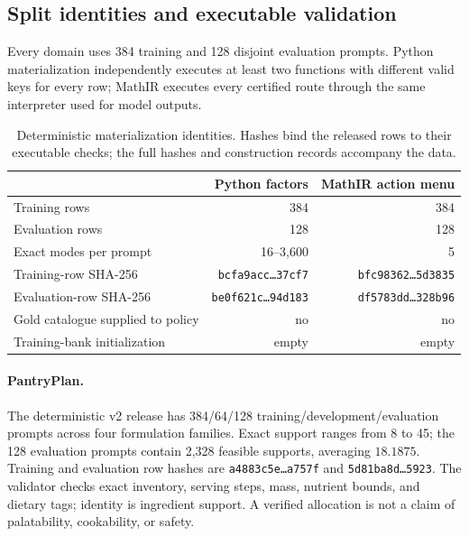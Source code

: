 \documentclass{article}
\newcommand{\1}{\mathbf 1}
\theoremstyle{remark}
\theoremstyle{definition}
\theoremstyle{plain}
\begin{document}
\subsection{Split identities and executable validation}
\label{app:data-materialization}

Every domain uses 384 training and 128 disjoint evaluation prompts.
Python materialization independently executes at least two functions with
different valid keys for every row; MathIR executes every certified route
through the same interpreter used for model outputs.

\begin{table}[H]
\centering
\caption{Deterministic materialization identities. Hashes bind the released rows to their executable checks; the full hashes and construction records accompany the data.}
\label{tab:materialization-identities}
\small
\begin{tabular}{@{}lrr@{}}
\toprule
& \textbf{Python factors} & \textbf{MathIR action menu} \\
\midrule
Training rows & 384 & 384 \\
Evaluation rows & 128 & 128 \\
Exact modes per prompt & 16--3,600 & 5 \\
Training-row SHA-256 & \texttt{bcfa9acc\ldots37cf7} & \texttt{bfc98362\ldots5d3835} \\
Evaluation-row SHA-256 & \texttt{be0f621c\ldots94d183} & \texttt{df5783dd\ldots328b96} \\
Gold catalogue supplied to policy & no & no \\
Training-bank initialization & empty & empty \\
\bottomrule
\end{tabular}
\end{table}

\paragraph{PantryPlan.}
\label{app:data-pantry}
The deterministic v2 release has 384/64/128 training/development/evaluation
prompts across four formulation families. Exact support ranges from 8 to 45;
the 128 evaluation prompts contain 2,328 feasible supports, averaging
$18.1875$. Training and evaluation row hashes are
\texttt{a4883c5e\ldots a757f} and \texttt{5d81ba8d\ldots5923}.
The validator checks exact inventory, serving steps, mass, nutrient bounds,
and dietary tags; identity is ingredient support. A verified allocation is
not a claim of palatability, cookability, or safety.
\end{document}
